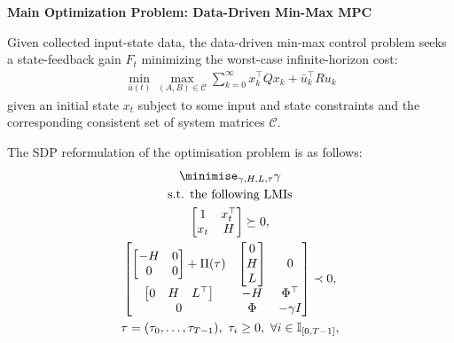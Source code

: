 \begin{framed}
	\noindent
	\textbf{Main Optimization Problem: Data-Driven Min-Max MPC}

	\vspace{0.3em}
	Given collected input-state data, the data-driven min-max control problem seeks a state-feedback gain \(F_t\) minimizing the worst-case infinite-horizon cost:
	\begin{align*}
	\min_{\bar{u}(t)} \max_{(A, B) \in \mathcal{C}} \sum_{k=0}^{\infty} x_k^\top Q x_k + \bar{u}_k^\top R u_k
	\end{align*}
	given an initial state $x_t$ subject to some input and state constraints and the corresponding consistent set of system matrices \(\mathcal{C}\).

	The SDP reformulation of the optimisation problem is as follows:
	\begin{subequations}\nonumber %
		\begin{gather*}
			\minimise_{\gamma, H, L, \tau} \gamma \\
			\text{s.t. the following LMIs}
			\\
			\begin{bmatrix}
				1 & x_t^\top \\
				x_t & H
			\end{bmatrix} \succeq 0,
			\\
			\begin{bmatrix}
				\begin{bmatrix}
					-H & 0 \\
					0 & 0
				\end{bmatrix}
				+
				\Pi(\tau)
				&
				\begin{bmatrix}
					0 \\
					H \\
					L
				\end{bmatrix}
				&
				0 \\
				\begin{bmatrix}
					0 & H & L^\top
				\end{bmatrix}
				& -H & \Phi^\top \\
				0 & \Phi & -\gamma I
			\end{bmatrix} \prec 0,
			\\
			\tau = (\tau_0, \ldots, \tau_{T-1}), \ \tau_i \geq 0, \ \forall i \in \mathbb{I}_{[0, T-1]},

\end{gather*}
\end{subequations}
\end{framed}
